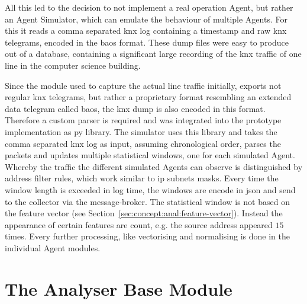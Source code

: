 All this led to the decision to not implement a real operation Agent, but rather an Agent Simulator, which can emulate the behaviour of multiple Agents.
For this it reads a comma separated \gls{knx} log containing a timestamp and raw \gls{knx} telegrams, encoded in the \gls{baos} format.
These dump files were easy to produce out of a database, containing a significant large recording of the \gls{knx} traffic of one line in the computer science building.

Since the module used to capture the actual line traffic initially, exports not regular \gls{knx} telegrams, but rather a proprietary format resembling an extended data telegram called \gls{baos}, the \gls{knx} dump is also encoded in this format.
Therefore a custom parser is required and was integrated into the prototype implementation as \gls{py} library.
The simulator uses this library and takes the comma separated \gls{knx} log as input, assuming chronological order, parses the packets and updates multiple statistical windows, one for each simulated Agent. Whereby the traffic the different simulated Agents can observe is distinguished by address filter rules, which work similar to \gls{ip} subnets masks. 
Every time the window length is exceeded in log time, the windows are encode in \gls{json} and send to the collector via the message-broker.
The statistical window is not based on the feature vector (see Section~\ref{sec:concept:anal:feature-vector}). Instead the appearance of certain features are count, e.g. the source address  appeared $15$ times.
Every further processing, like vectorising and normalising is done in the individual Agent modules.

\section{The Analyser Base Module}
\label{sec:impl:base}

